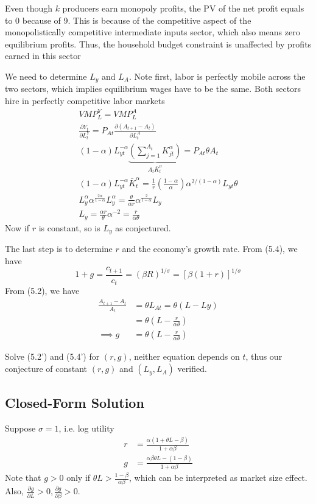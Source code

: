 \documentclass[twocolumn, fleqn]{article}
\begin{document}
		\begin{note}
			Even though $k$ producers earn monopoly profits, the PV of the net profit equals to 0 because of 9.
			This is because of the competitive aspect of the monopolistically competitive intermediate inputs
			sector, which also means zero equilibrium profits.
			Thus, the household budget constraint is unaffected by profits earned in this sector
		\end{note}

		We need to determine $L_y$ and $L_A$.
		Note first, labor is perfectly mobile across the two sectors, which implies equilibrium wages have to be the
			same.
		Both sectors hire in perfectly competitive labor markets
		\begin{gather*}
			VMP_L^Y = VMP_L^A\\
			\frac{\partial Y_t}{\partial L_t^Y} = P_{At} \frac{\partial (A_{t+1}-A_t)}{\partial L_t^A}\\
			(1-\alpha)L_{yt}^{-\alpha} \underbrace{(\sum_{j=1}^{A_t}K_{jt}^\alpha )}_{A_t \bar{K}_t^\alpha} = P_{At}\theta A_t\\
			(1-\alpha)L_{yt}^{-\alpha} \bar{K}_t^\alpha = \frac{1}{r}\left( \frac{1-\alpha}{\alpha} \right) \alpha^{
				2/(1-\alpha)}L_{yt}\theta\\
			L_y^{\alpha} \alpha^{\frac{2\alpha}{1-\alpha}}L_y^{\alpha} = \frac{\theta}{\alpha r}\alpha^{
				\frac{2}{1-\alpha}}L_y\\
			L_y = \frac{\alpha r}{\theta}\alpha^{-2}= \frac{r}{\alpha \theta} \tag{5.10}
		\end{gather*}
		Now if $r$ is constant, so is $L_y$ as conjectured.

		The last step is to determine $r$ and the economy's growth rate.
		From (5.4), we have
		\[1+g = \frac{c_{t+1}}{c_t}= (\beta R)^{1/\sigma}= [\beta(1+r)]^{1/\sigma} \tag{5.4'}\]
		From (5.2), we have
		\begin{align*}
			\frac{A_{t+1}-A_t}{A_t} &= \theta L_{At} = \theta(L-Ly)\\
			&= \theta(L -\frac{r}{\alpha \theta})\\
			\implies g &= \theta(L-\frac{r}{\alpha \theta}) \tag{5.2'}
		\end{align*}

		Solve (5.2') and (5.4') for $(r,g)$, neither equation depends on $t$, thus our conjecture of constant $(r,g)$ and $(L_y, L_A)$ verified.


		\subsection{Closed-Form Solution}
		Suppose $\sigma = 1$, i.e. log utility
		\begin{align*}
			r &= \frac{\alpha(1+\theta L -\beta)}{1+\alpha \beta}\\
			g &= \frac{\alpha \beta \theta L - (1-\beta)}{1+\alpha \beta}
		\end{align*}
		Note that $g>0$ only if $\theta L > \frac{1-\beta}{\alpha \beta}$, which can be interpreted as market size
			effect.
		Also, $\frac{\partial g}{\partial L}>0, \frac{\partial g}{\partial \beta}>0$.
\end{document}
